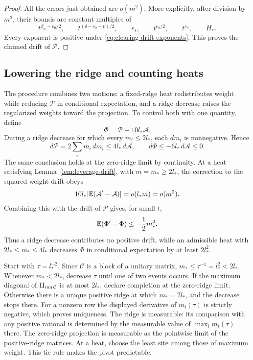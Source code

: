 \begin{proof}
All the errors just obtained are \(o(m^2)\).  More explicitly, after
division by \(m^2\), their bounds are constant multiples of
\[
 t^{\beta_w-e_0/2},\qquad
 t^{(\delta-e_0-\nu)/2},\qquad
 \varepsilon_t,\qquad t^{e_0/2},\qquad t^{e_0},\qquad H_*.
\]
Every exponent is positive under
\eqref{eq:clearing-drift-exponents}. This proves the claimed drift
of \(\mathcal P\).
\end{proof}

\subsection{Lowering the ridge and counting heats}
\label{subsec:clearing-ridge-count}

The procedure combines two motions: a fixed-ridge heat redistributes
weight while reducing $\mathcal P$ in conditional expectation, and a
ridge decrease raises the regularized weights toward the projection.
To control both with one quantity, define
\[
 \Phi=\mathcal P-10l_*\mathcal A.
\]
During a ridge decrease for which every $m_i\le2l_*$, each $dm_i$ is
nonnegative. Hence
\begin{equation}\label{eq:clearing-ridge-monotonicity}
 d\mathcal P=2\sum_i m_i\,dm_i\le4l_*\,d\mathcal A,
 \qquad d\Phi\le-6l_*\,d\mathcal A\le0.
\end{equation}
The same conclusion holds at the zero-ridge limit by continuity. At a
heat satisfying Lemma~\ref{lem:leverage-drift}, with $m=m_*\ge2l_*$,
the correction to the squared-weight drift obeys
\[
 10l_*|\mathbb E(\mathcal A'-\mathcal A)|=o(l_*m)=o(m^2).
\]
Combining this with the drift of $\mathcal P$ gives, for small $t$,
\begin{equation}\label{eq:clearing-phi-drift}
 \mathbb E(\Phi'-\Phi)\le-\frac12m_*^2.
\end{equation}
Thus a ridge decrease contributes no positive drift, while an admissible
heat with $2l_*\le m_*\le4l_*$ decreases $\Phi$ in conditional expectation by
at least $2l_*^2$.

Start with $\tau=l_*^{-2}$. Since $\mathcal C$ is a block of a unitary
matrix, $m_*\le\tau^{-1}=l_*^2<2l_*$. Whenever $m_*<2l_*$, decrease
$\tau$ until one of two events occurs. If the maximum diagonal of
$\Pi_{\operatorname{ran}\mathcal C}$ is at most $2l_*$, declare completion at the
zero-ridge limit. Otherwise there is a unique positive ridge at which
$m_*=2l_*$, and the decrease stops there. For a nonzero row the displayed
derivative of $m_i(\tau)$ is strictly negative, which proves uniqueness.
The ridge is measurable: its comparison with any positive rational is
determined by the measurable value of $\max_i m_i(\tau)$ there. The
zero-ridge projection is measurable as the pointwise limit of the
positive-ridge matrices. At a heat, choose the least site among those
of maximum weight. This tie rule makes the pivot predictable.

